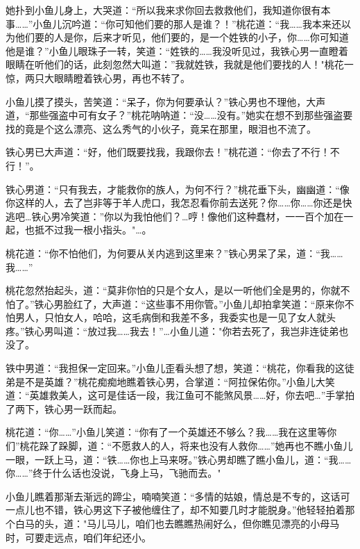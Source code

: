 \documentclass[12pt,oneside]{book}
\begin{document}
她扑到小鱼儿身上，大哭道：``所以我来求你回去救救他们，我知道你很有本事\ldots\ldots{}''小鱼儿沉吟道：``你可知他们要的那人是谁？！''桃花道：``我\ldots\ldots 我本来还以为他们要的人是你，后来才听见，他们要的，是一个姓铁的小子，你\ldots\ldots 你可知道他是谁？''小鱼儿眼珠子一转，笑道：``姓铁的\ldots\ldots 我没听见过，我铁心男一直瞪着眼睛在听他们的话，此刻忽然大叫道：''我就姓铁，我就是他们要找的人！"桃花一惊，两只大眼睛瞪着铁心男，再也不转了。

小鱼儿摸了摸头，苦笑道：``呆子，你为何要承认？''铁心男也不理他，大声道，``那些强盗中可有女子？''桃花呐呐道：``没\ldots\ldots 没有。''她实在想不到那些强盗要找的竟是个这么漂亮、这么秀气的小伙子，竟呆在那里，眼泪也不流了。

铁心男已大声道：``好，他们既要找我，我跟你去！''桃花道：``你去了不行！不行！''。

铁心男道：``只有我去，才能救你的族人，为何不行？''桃花垂下头，幽幽道：``像你这样的人，去了岂非等于羊人虎口，我怎忍看你前去送死？你\ldots\ldots 你\ldots\ldots 你还是快逃吧\ldots 铁心男冷笑道：''你以为我怕他们？\ldots 哼！像他们这种蠢材，一一百个加在一起，也抵不过我一根小指头。"\ldots。

桃花道：``你不怕他们，为何要从关内逃到这里来？''铁心男呆了呆，道：``我\ldots\ldots 我\ldots\ldots{}''

桃花忽然抬起头，道：``莫非你怕的只是个女人，是以一听他们全是男的，你就不怕了。''铁心男脸红了，大声道：``这些事不用你管。''小鱼儿却拍拿笑道：``原来你不怕男人，只怕女人，哈哈，这毛病倒和我差不多，我委实也是一见了女人就头疼。''铁心男叫道：``放过我\ldots\ldots 我去！''\ldots 小鱼儿道："你若去死了，我岂非连徒弟也没了。

铁中男道：``我担保一定回来。''小鱼儿歪看头想了想，笑道：``桃花，你看我的这徒弟是不是英雄？''桃花痴痴地瞧着铁心男，合掌道：``阿拉保佑你。''小鱼儿大笑道：``英雄救美人，这可是佳话一段，我江鱼可不能煞风景\ldots\ldots 好，你去吧\ldots{}''手掌拍了两下，铁心男一跃而起。

桃花道：``你\ldots\ldots{}''小鱼儿笑道：``你有了一个英雄还不够么？我\ldots\ldots 我在这里等你们''桃花跺了跺脚，道：``不愿救人的人，将来也没有人救你\ldots\ldots{}''她再也不瞧小鱼儿一眼，一跃上马，道：``铁\ldots\ldots 你也上马来呀。''铁心男却瞧了瞧小鱼儿，道：``我\ldots\ldots 你\ldots\ldots{}''终于什么话也没说，飞身上马，飞驰而去。"

小鱼儿瞧着那渐去渐远的蹄尘，喃喃笑道：``多情的姑娘，情总是不专的，这话可一点儿也不错，铁心男这下子被他缠住了，却不知要几时才能脱身。''他轻轻拍着那个白马的头，道："马儿马儿，咱们也去瞧瞧热闹好么，但你瞧见漂亮的小母马时，可要走远点，咱们年纪还小。
\end{document}
